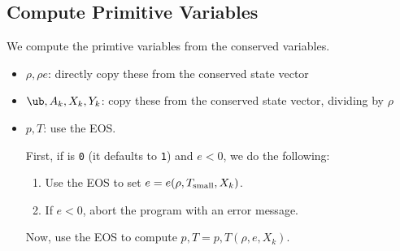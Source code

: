 \subsection{Compute Primitive Variables}\label{Sec:Compute Primitive Variables}

We compute the primtive variables from the conserved variables.
\begin{itemize}
\item $\rho, \rho e$: directly copy these from the conserved state
  vector
\item $\ub, A_k, X_k, Y_k$: copy these from the conserved state
  vector, dividing by $\rho$
\item $p,T$: use the EOS.

  First, if  is {\tt 0} (it defaults to
  {\tt 1}) and $e < 0$, we do the following:

  \begin{enumerate}
  \item Use the EOS to set $e = e(\rho,T_{\rm small},X_k)$.
  \item If $e < 0$, abort the program with an error message.
  \end{enumerate}
  Now, use the EOS to compute $p,T = p,T(\rho,e,X_k)$.
\end{itemize}

